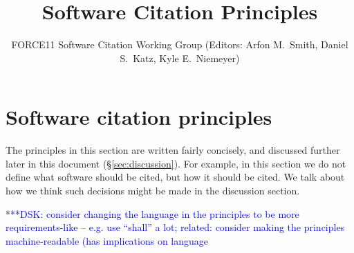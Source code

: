 \documentclass[11pt, oneside]{amsart}
\title{Software Citation Principles}
\author{FORCE11 Software Citation Working Group (Editors: Arfon M.~Smith, Daniel S.~Katz, Kyle E.~Niemeyer)}
\date{}
\newcommand{\katznote}[1]{ {\textcolor{blue} { ***DSK: #1 }}} %
\begin{document}
\begin{abstract}
\end{abstract}

\maketitle


\section{Software citation principles}
\label{sec:principles}

The principles in this section are written fairly concisely, and discussed
further later in this document (\S\ref{sec:discussion}). For example, in this
section we do not define what software should be cited, but how it should be
cited.  We talk about how we think such decisions might be made in the
discussion section.

\katznote{consider changing the language in the principles to be more requirements-like -- e.g. use ``shall'' a lot; related: consider making the principles machine-readable (has implications on language}
\end{document}
